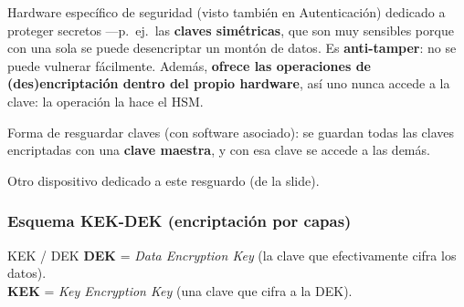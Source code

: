\documentclass[11pt,a4paper]{article}
\begin{document}
\begin{description}[leftmargin=0pt,itemsep=4pt]
  \item[\textbf{HSM} (\emph{Hardware Security Module}, FIPS 140-1 a 4).] Hardware específico de
        seguridad (visto también en Autenticación) dedicado a proteger secretos —p.\ ej.\ las
        \textbf{claves simétricas}, que son muy sensibles porque con una sola se puede
        desencriptar un montón de datos. Es \textbf{anti-tamper}: no se puede vulnerar
        fácilmente. Además, \textbf{ofrece las operaciones de (des)encriptación dentro del
        propio hardware}, así uno nunca accede a la clave: la operación la hace el HSM.
  \item[\textbf{Keystore.}] Forma de resguardar claves (con software asociado): se guardan
        todas las claves encriptadas con una \textbf{clave maestra}, y con esa clave se accede
        a las demás.
  \item[\textbf{Security Appliance.}] Otro dispositivo dedicado a este resguardo (de la slide).
\end{description}

\subsubsection*{Esquema KEK-DEK (encriptación por capas)}

\begin{defbox}{KEK / DEK}
\textbf{DEK} = \emph{Data Encryption Key} (la clave que efectivamente cifra los datos).\\
\textbf{KEK} = \emph{Key Encryption Key} (una clave que cifra a la DEK).
\end{defbox}

\begin{center}
\end{center}
\end{document}
